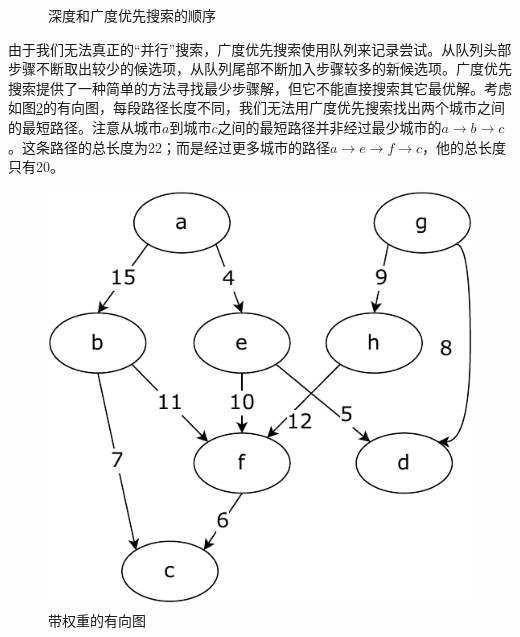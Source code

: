 \documentclass[b5paper]{ctexart}
\begin{document}
\begin{figure}[htbp]
 \centering
 \caption{深度和广度优先搜索的顺序}
 \label{fig:dfs-bfs-tree}
\end{figure}

由于我们无法真正的“并行”搜索，广度优先搜索使用队列来记录尝试。从队列头部步骤不断取出较少的候选项，从队列尾部不断加入步骤较多的新候选项。广度优先搜索提供了一种简单的方法寻找最少步骤解，但它不能直接搜索其它最优解。考虑如图\ref{fig:weighted-dag}的有向图，每段路径长度不同，我们无法用广度优先搜索找出两个城市之间的最短路径。注意从城市$a$到城市$c$之间的最短路径并非经过最少城市的$a \to b \to c$。这条路径的总长度为22；而是经过更多城市的路径$a \to e \to f \to c$，他的总长度只有20。

\begin{figure}[htbp]
 \centering
 \includegraphics[scale=0.5]{img/weighted-dag}
 \caption{带权重的有向图}
 \label{fig:weighted-dag}
\end{figure}

\begin{Exercise}
\end{Exercise}
\end{document}
